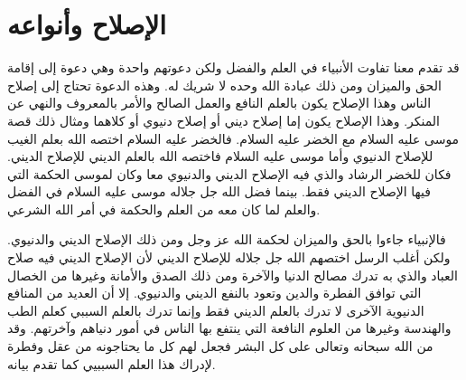 

\section{الإصلاح وأنواعه}
قد تقدم معنا تفاوت الأنبياء في العلم والفضل ولكن دعوتهم واحدة وهي دعوة إلى إقامة الحق والميزان ومن ذلك عبادة الله وحده لا شريك له. وهذه الدعوة تحتاج إلى إصلاح الناس وهذا الإصلاح يكون بالعلم النافع والعمل الصالح والأمر بالمعروف والنهي عن المنكر. وهذا الإصلاح يكون إما إصلاح ديني أو إصلاح دنيوي أو كلاهما ومثال ذلك قصة موسى عليه السلام مع الخضر عليه السلام. فالخضر عليه السلام اختصه الله بعلم الغيب للإصلاح الدنيوي وأما موسى عليه السلام فاختصه الله بالعلم الديني للإصلاح الديني. فكان للخضر الرشاد والذي فيه الإصلاح الديني والدنيوي معا وكان لموسى الحكمة التي فيها الإصلاح الديني فقط. بينما فضل الله جل جلاله موسى عليه السلام في الفضل والعلم لما كان معه من العلم والحكمة في أمر الله الشرعي. 

فالإنبياء جاءوا بالحق والميزان لحكمة الله عز وجل ومن ذلك الإصلاح الديني والدنيوي. ولكن أغلب الرسل اختصهم الله جل جلاله للإصلاح الديني لأن الإصلاح الديني فيه صلاح العباد والذي به تدرك مصالح الدنيا والآخرة ومن ذلك الصدق والأمانة وغيرها من الخصال التي توافق الفطرة والدين وتعود بالنفع الديني والدنيوي. إلا أن العديد من المنافع الدنيوية الآخرى لا تدرك بالعلم الديني فقط وإنما تدرك بالعلم السببي كعلم الطب والهندسة وغيرها من العلوم النافعة التي ينتفع بها الناس في أمور دنياهم وآخرتهم. وقد من الله سبحانه وتعالى على كل البشر فجعل لهم كل ما يحتاجونه من عقل وفطرة لإدراك هذا العلم السببيي كما تقدم بيانه. 

